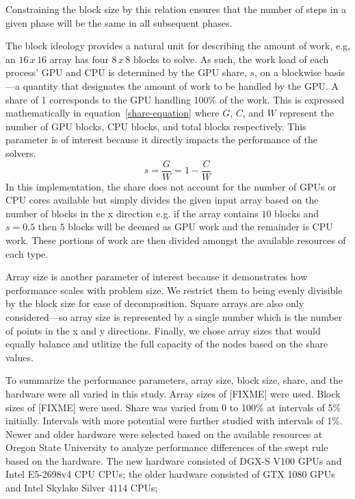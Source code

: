 \documentclass[review]{elsarticle}
\def\oldCPU{s}
\def\oldGPU{s}
\def\newCPU{s}
\def\newGPU{s}
\def\oldCPU{Intel Skylake Silver 4114} %
\def\oldGPU{GTX 1080}
\def\newCPU{Intel E5-2698v4 CPU} %
\def\newGPU{DGX-S V100}
\begin{document}
Constraining the block size by this relation ensures that the number of steps in a given phase will be the same in all subsequent phases. 

\par
The block ideology provides a natural unit for describing the amount of work, e.g, an $16\,x\,16$ array has four $8\,x\,8$ blocks to solve. As such, the work load of each process' GPU and CPU is determined by the GPU share, $s$, on a blockwise basis---a quantity that designates the amount of work to be handled by the GPU. A share of 1 corresponds to the GPU handling 100\% of the work. This is expressed mathematically in equation~\ref{share-equation} where $G$, $C$, and $W$ represent the number of GPU blocks, CPU blocks, and total blocks respectively. This parameter is of interest because it directly impacts the performance of the solvers.
\begin{equation}
    \label{share-equation}
    s = \frac{G}{W} = 1-\frac{C}{W}
\end{equation}
In this implementation, the share does not account for the number of GPUs or CPU cores available but simply divides the given input array based on the number of blocks in the x direction e.g. if the array contains $10$ blocks and $s=0.5$ then $5$ blocks will be deemed as GPU work and the remainder is CPU work. These portions of work are then divided amongst the available resources of each type. 

\par
Array size is another parameter of interest because it demonstrates how performance scales with problem size. We restrict them to being evenly divisible by the block size for ease of decomposition. Square arrays are also only considered---so array size is represented by a single number which is the number of points in the x and y directions. Finally, we chose array sizes that would equally balance and utlitize the full capacity of the nodes based on the share values.

\par
To summarize the performance parameters, array size, block size, share, and the hardware were all varied in this study. Array sizes of [FIXME] were used. Block sizes of [FIXME] were used. Share was varied from 0 to 100\% at intervals of 5\% initially. Intervals with more potential were further studied with intervals of 1\%. Newer and older hardware were selected based on the available resources at Oregon State University to analyze performance differences of the swept rule based on the hardware. The new hardware consisted of \newGPU{} GPUs and \newCPU{} CPUs; the older hardware consisted of \oldGPU{} GPUs and \oldCPU{} CPUs;
\end{document}
